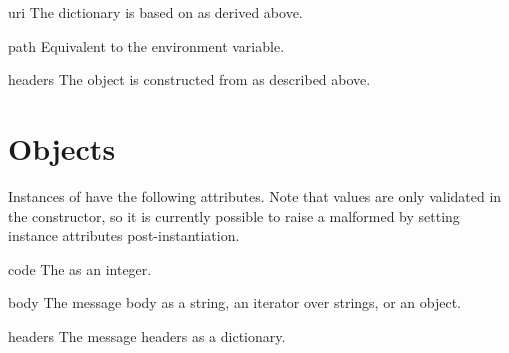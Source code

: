 \begin{datadesc}{uri}
The dictionary is based on  as derived above.
\end{datadesc}

\begin{datadesc}{path}
Equivalent to the  environment variable.
\end{datadesc}

\begin{datadesc}{headers}
The  object is constructed from  as described
above.
\end{datadesc}


\begin{seealso}
\end{seealso}



\section{ Objects}

Instances of  have the following attributes. Note that
values are only validated in the constructor, so it is currently possible to
raise a malformed  by setting instance attributes
post-instantiation.

\begin{datadesc}{code}
The  as an integer.
\end{datadesc}

\begin{datadesc}{body}
The message body as a string, an iterator over strings, or an
 object.
\end{datadesc}

\begin{datadesc}{headers}
The message headers as a dictionary.
\end{datadesc}



\section{}
\section{}



